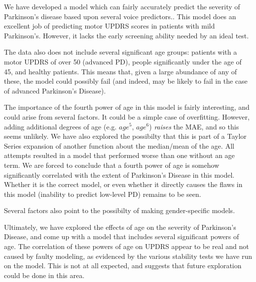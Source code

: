 \documentclass{report}
\begin{document}
We have developed a model which can fairly accurately predict the severity of Parkinson's disease based 
upon several voice predictors.. This model does an excellent job of predicting motor UPDRS scores in patients with mild
Parkinson's. However, it lacks the early screening ability needed by an ideal test. 

The data also does not include several significant age groups: patients with a motor UPDRS of over 50 (advanced PD), people significantly under the
age of 45, and healthy patients. This means that, given a large abundance of any of these, the model could possibly fail (and indeed, may be likely to
fail in the case of advanced Parkinson's Disease).

The importance of the fourth power of age in this model is fairly interesting, and could arise from several factors. It could be a simple case of overfitting.
However, adding additional degrees of age (e.g. $age^5$, $age^6$) \textit{raises} the MAE, and so this seems unlikely. We have also explored the possibilty that
this is part of a Taylor Series expansion of another function about the median/mean of the age. All attempts resulted in a model that performed worse
than one without an age term. We are forced to conclude that a fourth power of age is somehow significantly correlated with the extent of Parkinson's Disease
in this model. Whether it is the correct model, or even whether it directly causes the flaws in this model (inability to predict low-level PD) remains to be seen.

Several factors also point to the possibilty of making gender-specific models. 

Ultimately, we have explored the effects of age on the severity of Parkinson's Disease, and come up with a model that includes several significant powers of age.
The correlation of these powers of age on UPDRS appear to be real and not caused by faulty modeling, as evidenced by the various stability tests we have run on the model.
This is not at all expected, and suggests that future exploration could be done in this area.





\end{document}
